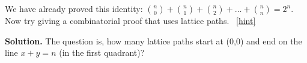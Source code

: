 \documentclass{book}
\begin{document}
\setcounter{project}{96}
\addtocounter{project}{-1}
\begin{activity}[]\label{activity-89}
\hypertarget{p-725}{}%
We have already proved this identity: \(\binom{n}{0} + \binom{n}{1} + \binom{n}{2} + \ldots + \binom{n}{n} = 2^{n}\).  Now try giving a combinatorial proof that uses lattice paths.%
~\hfill{\tiny\hyperlink{a-96}{[hint]}\hypertarget{q-96}{}}\par\smallskip%
\noindent\textbf{Solution.}\hypertarget{solution-70}{}\quad%
\hypertarget{p-727}{}%
The question is, how many lattice paths start at (0,0) and end on the line \(x+y=n\) (in the first quadrant)?%
\end{activity}
\end{document}
